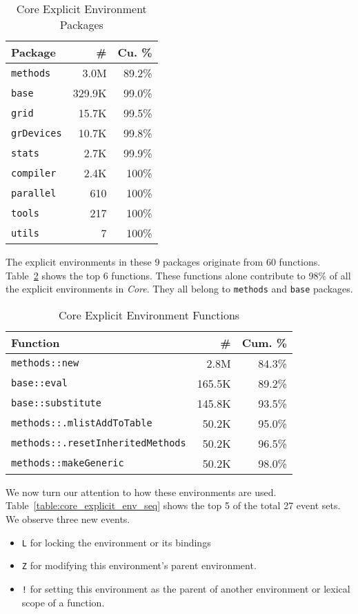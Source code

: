 \documentclass[10pt,review,sigplan,authorversion=true]{acmart}
\newcommand{\code}[1]{\lstinline |#1|\xspace}
\begin{document}
\begin{table}[!h]
  \small
  \caption{Core Explicit Environment Packages} \label{table:core_explicit_pack}
  \centering
  \begin{tabular}{lrr}
    \toprule
    \textbf{Package}&\textbf{\#}&\textbf{Cu. \%}\\
    \midrule
    \code{methods}&3.0M&89.2\%\\
    \code{base}&329.9K&99.0\%\\
    \code{grid}&15.7K&99.5\%\\
    \code{grDevices}&10.7K&99.8\%\\
    \code{stats}&2.7K&99.9\%\\
    \code{compiler}&2.4K&100\%\\
    \code{parallel}&610&100\%\\
    \code{tools}&217&100\%\\
    \code{utils}&7&100\%\\
    \bottomrule
  \end{tabular}
\end{table}

The explicit environments in these 9 packages originate from 60 functions.
Table~\ref{table:core_explicit_fun} shows the top 6 functions. These functions
alone contribute to 98\% of all the explicit environments in \emph{Core}. They
all belong to \code{methods} and \code{base} packages.

\begin{table}[!h]
  \small
  \caption{Core Explicit Environment Functions} \label{table:core_explicit_fun}
  \centering
  \begin{tabular}{lrr}
    \toprule
    \textbf{Function}&\textbf{\#}&\textbf{Cum. \%}\\
    \midrule
    \code{methods::new}&2.8M&84.3\%\\
    \code{base::eval}&165.5K&89.2\%\\
    \code{base::substitute}&145.8K&93.5\%\\
    \code{methods::.mlistAddToTable}&50.2K&95.0\%\\
    \code{methods::.resetInheritedMethods}&50.2K&96.5\%\\
    \code{methods::makeGeneric}&50.2K&98.0\%\\
    \bottomrule
  \end{tabular}
\end{table}

We now turn our attention to how these environments are used.
Table~\ref{table:core_explicit_env_seq} shows the top 5 of the total 27 event
sets. We observe three new events.
\begin{itemize}
\item \texttt{L} for locking the environment or its bindings
\item \texttt{Z} for modifying this environment's parent environment.
\item \texttt{!} for setting this environment as the parent of another
  environment or lexical scope of a function.
\end{itemize}
\end{document}
